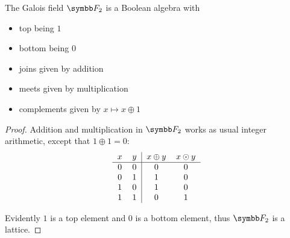 \begin{theorem}\label{thm:f2_is_boolean_algebra}
  The Galois field \( \F_2 \) is a Boolean algebra with
  \begin{itemize}
    \item top being \( 1 \)
    \item bottom being \( 0 \)
    \item joins given by addition
    \item meets given by multiplication
    \item complements given by \( x \mapsto x \oplus 1 \)
  \end{itemize}
\end{theorem}
\begin{proof}
  Addition and multiplication in \( \F_2 \) works as usual integer arithmetic, except that \( 1 \oplus 1 = 0 \):
  \begin{equation*}
    \begin{tabular}{c c | c c}
      \( x \)    & \( y \)    & \( x \oplus y \) & \( x \odot y \) \\
      \hline
      \( 0 \)    & \( 0 \)    & \( 0 \)          & \( 0 \) \\
      \( 0 \)    & \( 1 \)    & \( 1 \)          & \( 0 \) \\
      \( 1 \)    & \( 0 \)    & \( 1 \)          & \( 0 \) \\
      \( 1 \)    & \( 1 \)    & \( 0 \)          & \( 1 \)
    \end{tabular}
  \end{equation*}

  Evidently \( 1 \) is a top element and \( 0 \) is a bottom element, thus \( \F_2 \) is a lattice.


\end{proof}
